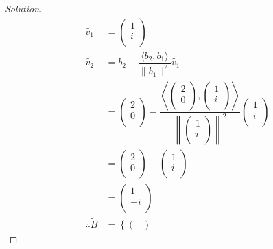 \documentclass[fleqn, a4paper, 12pt]{article}
\theoremstyle{definition}
\theoremstyle{theorem}
\newenvironment{solution}
{\begin{proof}[Solution]\let\qed\relax}
	{\end{proof}}
\begin{document}
\begin{solution}
	\begin{align*}
		\widetilde{v_1} &= 
			\begin{pmatrix}
				1\\
				i\\
			\end{pmatrix}\\
		\widetilde{v_2} &= b_2 - \dfrac{\langle b_2, b_1 \rangle}{\| b_1 \|^2} \widetilde{v_1}\\
		&= 
			\begin{pmatrix}
				2\\
				0\\
			\end{pmatrix}
			-
			\dfrac
				{
					\left\langle
						\begin{pmatrix}
							2\\
							0\\
						\end{pmatrix}
						,
						\begin{pmatrix}
							1\\
							i\\
						\end{pmatrix}
					\right\rangle
				}
				{
					\left\|
						\begin{pmatrix}
							1\\
							i\\
						\end{pmatrix}
					\right\|^2
				}
				\begin{pmatrix}
					1\\
					i\\
				\end{pmatrix}\\
		&= 
			\begin{pmatrix}
				2\\
				0\\
			\end{pmatrix}
			-
			\begin{pmatrix}
				1\\
				i\\
			\end{pmatrix}\\
		&= 
			\begin{pmatrix}
				1\\
				-i\\
			\end{pmatrix}\\
		\therefore \widetilde{B} &= 
			\left\lbrace
				\begin{pmatrix}

\end{pmatrix}
\end{align*}
\end{solution}
\end{document}
